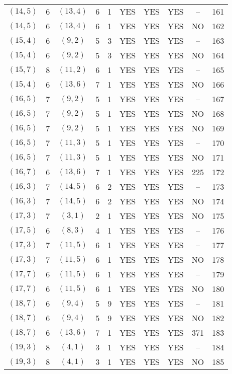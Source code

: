 \begin{longtable}{|c|c|c|c|c|c|c|c|c|c|}
$(14, 5)$ & 6 & $(13, 4)$ & 6 & 1 & YES & YES & YES & -- & 161\\
$(14, 5)$ & 6 & $(13, 4)$ & 6 & 1 & YES & YES & YES & NO & 162\\
$(15, 4)$ & 6 & $(9, 2)$ & 5 & 3 & YES & YES & YES & -- & 163\\
$(15, 4)$ & 6 & $(9, 2)$ & 5 & 3 & YES & YES & YES & NO & 164\\
$(15, 7)$ & 8 & $(11, 2)$ & 6 & 1 & YES & YES & YES & -- & 165\\
$(15, 4)$ & 6 & $(13, 6)$ & 7 & 1 & YES & YES & YES & NO & 166\\
$(16, 5)$ & 7 & $(9, 2)$ & 5 & 1 & YES & YES & YES & -- & 167\\
$(16, 5)$ & 7 & $(9, 2)$ & 5 & 1 & YES & YES & YES & NO & 168\\
$(16, 5)$ & 7 & $(9, 2)$ & 5 & 1 & YES & YES & YES & NO & 169\\
$(16, 5)$ & 7 & $(11, 3)$ & 5 & 1 & YES & YES & YES & -- & 170\\
$(16, 5)$ & 7 & $(11, 3)$ & 5 & 1 & YES & YES & YES & NO & 171\\
$(16, 7)$ & 6 & $(13, 6)$ & 7 & 1 & YES & YES & YES & 225 & 172\\
$(16, 3)$ & 7 & $(14, 5)$ & 6 & 2 & YES & YES & YES & -- & 173\\
$(16, 3)$ & 7 & $(14, 5)$ & 6 & 2 & YES & YES & YES & NO & 174\\
$(17, 3)$ & 7 & $(3, 1)$ & 2 & 1 & YES & YES & YES & NO & 175\\
$(17, 5)$ & 6 & $(8, 3)$ & 4 & 1 & YES & YES & YES & -- & 176\\
$(17, 3)$ & 7 & $(11, 5)$ & 6 & 1 & YES & YES & YES & -- & 177\\
$(17, 3)$ & 7 & $(11, 5)$ & 6 & 1 & YES & YES & YES & NO & 178\\
$(17, 7)$ & 6 & $(11, 5)$ & 6 & 1 & YES & YES & YES & -- & 179\\
$(17, 7)$ & 6 & $(11, 5)$ & 6 & 1 & YES & YES & YES & NO & 180\\
$(18, 7)$ & 6 & $(9, 4)$ & 5 & 9 & YES & YES & YES & -- & 181\\
$(18, 7)$ & 6 & $(9, 4)$ & 5 & 9 & YES & YES & YES & NO & 182\\
$(18, 7)$ & 6 & $(13, 6)$ & 7 & 1 & YES & YES & YES & 371 & 183\\
$(19, 3)$ & 8 & $(4, 1)$ & 3 & 1 & YES & YES & YES & -- & 184\\
$(19, 3)$ & 8 & $(4, 1)$ & 3 & 1 & YES & YES & YES & NO & 185\\

\end{longtable}
